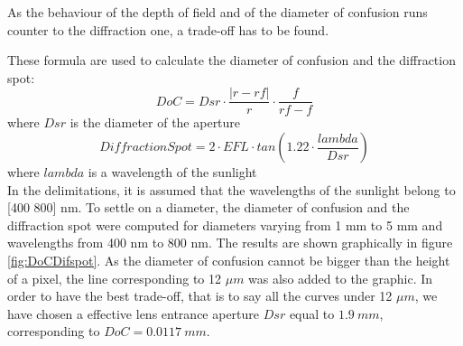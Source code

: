 As the behaviour of the depth of field and of the diameter of confusion runs counter to the diffraction one, a trade-off has to be found. 

These formula are used to calculate the diameter of confusion and the diffraction spot:
\begin{equation*}
DoC = Dsr \cdot \frac{|r-rf|}{r} \cdot \frac{f}{rf - f}
\end{equation*}
where $Dsr$ is the diameter of the aperture
\begin{equation*}
DiffractionSpot = 2 \cdot EFL \cdot tan(1.22 \cdot \frac{lambda}{Dsr})
\end{equation*}
where $lambda$ is a wavelength of the sunlight\\

In the delimitations, it is assumed that the wavelengths of the sunlight belong to [400 800] nm. To settle on a diameter, the diameter of confusion and the diffraction spot were computed for diameters varying from 1 mm to 5 mm and wavelengths from 400 nm to 800 nm. The results are shown graphically in figure \ref{fig:DoCDifspot}. As the diameter of confusion cannot be bigger than the height of a pixel, the line corresponding to 12 $\mu m$ was also added to the graphic. In order to have the best trade-off, that is to say all the curves under 12 $\mu m$, we have chosen a effective lens entrance aperture $Dsr$ equal to $1.9 \ mm$, corresponding to $DoC = 0.0117 \ mm$. 

